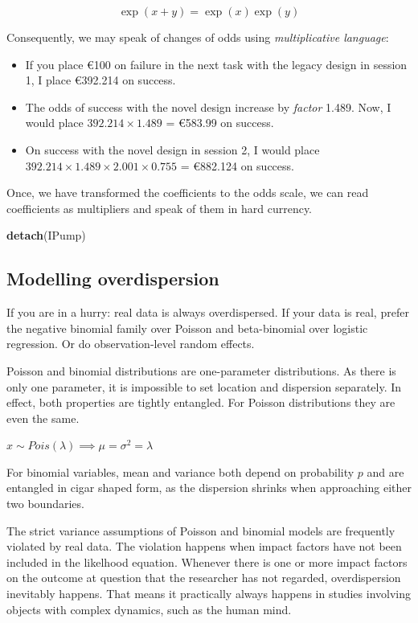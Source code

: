 \documentclass[]{svmono}
\newcommand{\euro}{€}
\newenvironment{Shaded}{\begin{snugshade}}{\end{snugshade}}
\newcommand{\KeywordTok}[1]{\textcolor[rgb]{0.13,0.29,0.53}{\textbf{#1}}}
\newcommand{\NormalTok}[1]{#1}
\providecommand{\tightlist}{%
  \setlength{\itemsep}{0pt}\setlength{\parskip}{0pt}}
\begin{document}
\[
\exp(x + y) = \exp(x)\exp(y)
\]

Consequently, we may speak of changes of odds using \emph{multiplicative
language}:

\begin{itemize}
\tightlist
\item
  If you place \euro{}100 on failure in the next task with the legacy
  design in session 1, I place \euro{}392.214 on success.
\item
  The odds of success with the novel design increase by \emph{factor}
  1.489. Now, I would place \(392.214 \times 1.489\) = \euro{}583.99 on
  success.
\item
  On success with the novel design in session 2, I would place
  \(392.214 \times 1.489 \times 2.001 \times 0.755\) = \euro{}882.124 on
  success.
\end{itemize}

Once, we have transformed the coefficients to the odds scale, we can
read coefficients as multipliers and speak of them in hard currency.

\begin{Shaded}
\begin{Highlighting}[]
\KeywordTok{detach}\NormalTok{(IPump)}
\end{Highlighting}
\end{Shaded}

\subsection{Modelling overdispersion}\label{modelling-overdispersion}

If you are in a hurry: real data is always overdispersed. If your data
is real, prefer the negative binomial family over Poisson and
beta-binomial over logistic regression. Or do observation-level random
effects.

Poisson and binomial distributions are one-parameter distributions. As
there is only one parameter, it is impossible to set location and
dispersion separately. In effect, both properties are tightly entangled.
For Poisson distributions they are even the same.

\(x \sim Pois(\lambda) \implies \mu = \sigma^2 = \lambda\)

For binomial variables, mean and variance both depend on probability
\(p\) and are entangled in cigar shaped form, as the dispersion shrinks
when approaching either two boundaries.

The strict variance assumptions of Poisson and binomial models are
frequently violated by real data. The violation happens when impact
factors have not been included in the likelhood equation. Whenever there
is one or more impact factors on the outcome at question that the
researcher has not regarded, overdispersion inevitably happens. That
means it practically always happens in studies involving objects with
complex dynamics, such as the human mind.
\end{document}
